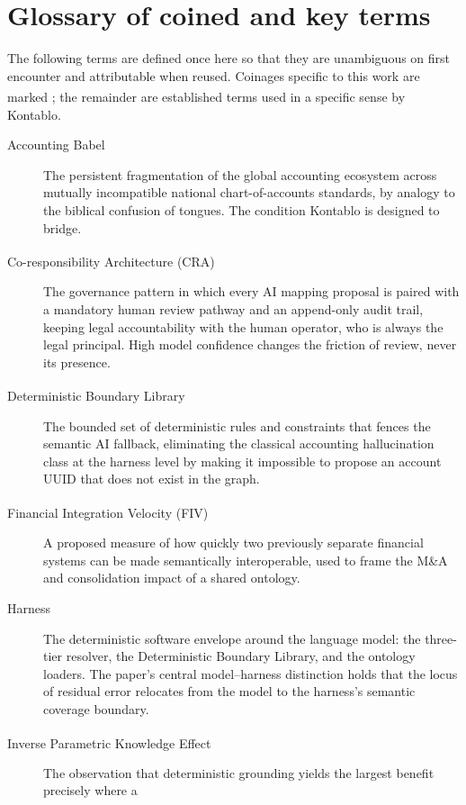 \section{Glossary of coined and key terms}
\label{sec:glossary}

The following terms are defined once here so that they are unambiguous on first
encounter and attributable when reused. Coinages specific to this work are marked
\textsuperscript{\dag}; the remainder are established terms used in a specific
sense by Kontablo.

\begin{description}
  \item[Accounting Babel] The persistent fragmentation of the global accounting
    ecosystem across mutually incompatible national chart-of-accounts standards,
    by analogy to the biblical confusion of tongues. The condition Kontablo is
    designed to bridge.
  \item[Co-responsibility Architecture (CRA)\textsuperscript{\dag}] The governance
    pattern in which every AI mapping proposal is paired with a mandatory human
    review pathway and an append-only audit trail, keeping legal accountability
    with the human operator, who is always the legal principal. High model
    confidence changes the friction of review, never its presence.
  \item[Deterministic Boundary Library\textsuperscript{\dag}] The bounded set of
    deterministic rules and constraints that fences the semantic AI fallback,
    eliminating the classical accounting hallucination class at the harness level
    by making it impossible to propose an account UUID that does not exist in the
    graph.
  \item[Financial Integration Velocity (FIV)\textsuperscript{\dag}] A proposed
    measure of how quickly two previously separate financial systems can be made
    semantically interoperable, used to frame the M\&A and consolidation impact of
    a shared ontology.
  \item[Harness] The deterministic software envelope around the language model:
    the three-tier resolver, the Deterministic Boundary Library, and the ontology
    loaders. The paper's central model--harness distinction holds that the locus
    of residual error relocates from the model to the harness's semantic coverage
    boundary.
  \item[Inverse Parametric Knowledge Effect\textsuperscript{\dag}] The observation
    that deterministic grounding yields the largest benefit precisely where a

\end{description}
